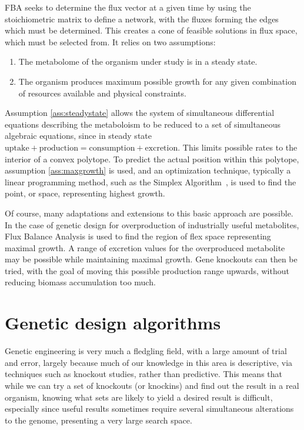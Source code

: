 FBA seeks to determine the flux vector at a given time by using the stoichiometric matrix to define a network, with the fluxes forming the edges which must be determined. 
This creates a cone of feasible solutions in flux space, which must be selected from. 
It relies on two assumptions:
\begin{enumerate}
\item \label{ass:steadystate} The metabolome of the organism under study is in a steady state.
\item \label{ass:maxgrowth} The organism produces maximum possible growth for any given combination of resources available and physical constraints.
\end{enumerate}
Assumption \ref{ass:steadystate} allows the system of simultaneous differential equations describing the metaboloism to be reduced to a set of simultaneous algebraic equations, since in steady state \(\text{uptake} + \text{production} = \text{consumption} + \text{excretion}\). 
This limits possible rates to the interior of a convex polytope. 
To predict the actual position within this polytope, assumption \ref{ass:maxgrowth} is used, and an optimization technique, typically a linear programming method, such as the Simplex Algorithm~\cite{Dantzig1951}, is used to find the point, or space, representing highest growth.

Of course, many adaptations and extensions to this basic approach are possible. 
In the case of genetic design for overproduction of industrially useful metabolites, Flux Balance Analysis is used to find the region of flex space representing maximal growth. A range of excretion values for the overproduced metabolite may be possible while maintaining maximal growth. Gene knockouts can then be tried, with the goal of moving this possible production range upwards, without reducing biomass accumulation too much.

\section{Genetic design algorithms}
Genetic engineering is very much a fledgling field, with a large amount of trial and error, largely because much of our knowledge in this area is descriptive, via techniques such as knockout studies, rather than predictive. 
This means that while we can try a set of knockouts (or knockins) and find out the result in a real organism, knowing what sets are likely to yield a desired result is difficult, especially since useful results sometimes require several simultaneous alterations to the genome, presenting a very large search space.

